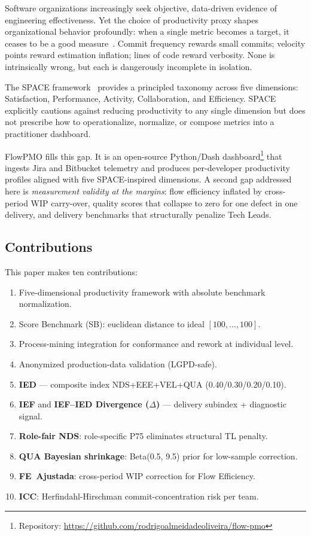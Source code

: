 \documentclass[conference]{IEEEtran}
\begin{document}
Software organizations increasingly seek objective, data-driven evidence of
engineering effectiveness. Yet the choice of productivity proxy shapes
organizational behavior profoundly: when a single metric becomes a target, it
ceases to be a good measure~\cite{demarco1999}. Commit frequency rewards small
commits; velocity points reward estimation inflation; lines of code reward
verbosity. None is intrinsically wrong, but each is dangerously incomplete in
isolation.

The SPACE framework~\cite{forsgren2021} provides a principled taxonomy across
five dimensions: Satisfaction, Performance, Activity, Collaboration, and
Efficiency. SPACE explicitly cautions against reducing productivity to any single
dimension but does not prescribe how to operationalize, normalize, or compose
metrics into a practitioner dashboard.

FlowPMO fills this gap. It is an open-source Python/Dash
dashboard\footnote{Repository: \url{https://github.com/rodrigoalmeidadeoliveira/flow-pmo}}
that ingests Jira and Bitbucket telemetry and produces per-developer productivity
profiles aligned with five SPACE-inspired dimensions. A second gap addressed here
is \emph{measurement validity at the margins}: flow efficiency inflated by
cross-period WIP carry-over, quality scores that collapse to zero for one defect
in one delivery, and delivery benchmarks that structurally penalize Tech Leads.

\subsection*{Contributions}

This paper makes ten contributions:
\begin{enumerate}
  \item Five-dimensional productivity framework with absolute benchmark normalization.
  \item Score Benchmark (SB): euclidean distance to ideal $[100,\ldots,100]$.
  \item Process-mining integration for conformance and rework at individual level.
  \item Anonymized production-data validation (LGPD-safe).
  \item \textbf{IED} --- composite index NDS+EEE+VEL+QUA (0.40/0.30/0.20/0.10).
  \item \textbf{IEF} and \textbf{IEF--IED Divergence ($\Delta$)} --- delivery subindex + diagnostic signal.
  \item \textbf{Role-fair NDS}: role-specific P75 eliminates structural TL penalty.
  \item \textbf{QUA Bayesian shrinkage}: Beta(0.5, 9.5) prior for low-sample correction.
  \item \textbf{FE~Ajustada}: cross-period WIP correction for Flow Efficiency.
  \item \textbf{ICC}: Herfindahl-Hirschman commit-concentration risk per team.
\end{enumerate}
\end{document}
